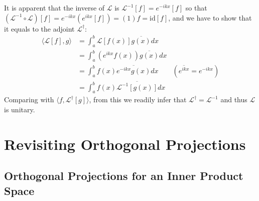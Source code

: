 \begin{solution}
It is apparent that the inverse of $\mathcal{L}$ is $\mathcal{L}^{-1}[f] = e^{-ikx}[f]$ so that $(\mathcal{L}^{-1} \circ \mathcal{L})[f] = e^{-ikx}(e^{ikx}[f]) = (1)f = \text{id}[f]$, and we have to show that it equals to the adjoint $\mathcal{L}^\dag$:
\begin{align*}
\langle \mathcal{L}[f], g \rangle &= \int_a^b \mathcal{L}[f(x)] \overline{g(x)} dx \\
&= \int_a^b (e^{ikx}f(x)) \overline{g(x)} dx \\
&= \int_a^b f(x) \overline{e^{-ikx}g(x)} dx & (\overline{e^{ikx}} = e^{-ikx}) \\
&= \int_a^b f(x) \overline{\mathcal{L}^{-1}[g(x)]} dx
\end{align*}
Comparing with $\langle f, \mathcal{L}^\dag[g] \rangle$, from this we readily infer that $\mathcal{L}^\dag = \mathcal{L}^{-1}$ and thus $\mathcal{L}$ is unitary.
\end{solution}

\section{Revisiting Orthogonal Projections}
\label{section:orthoproj}

\subsection{Orthogonal Projections for an Inner Product Space}

